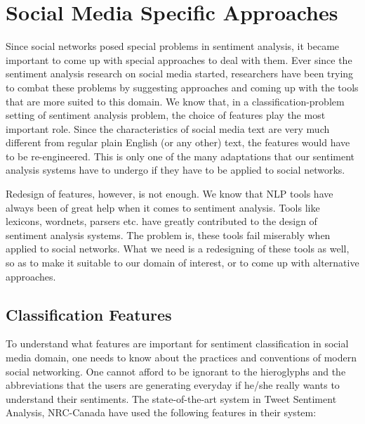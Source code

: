\chapter{Social Media Specific Approaches}\label{ch:saosm}


Since social networks posed special problems in sentiment analysis, it became important to come up with special approaches to deal with them. Ever since the sentiment analysis
research on social media started, researchers have been trying to combat these problems by suggesting approaches and coming up with the tools that are more suited to this domain.
We know that, in a classification-problem setting of sentiment analysis problem, the choice of features play the most important role. Since the characteristics of social media
text are very much different from regular plain English (or any other) text, the features would have to be re-engineered. This is only one of the many adaptations that our
sentiment analysis systems have to undergo if they have to be applied to social networks. 

\vspace{8mm}

Redesign of features, however, is not enough. We know that NLP tools have always been of great help when it comes to sentiment analysis. Tools like lexicons, wordnets, parsers etc. have
greatly contributed to the design of sentiment analysis systems. The problem is, these tools fail miserably when applied to social networks. What we need is a redesigning of these
tools as well, so as to make it suitable to our domain of interest, or to come up with alternative approaches.


\section{Classification Features}

To understand what features are important for sentiment classification in social media domain, one needs to know about the practices and conventions of modern social networking.
One cannot afford to be ignorant to the hieroglyphs and the abbreviations that the users are generating everyday if he/she really wants to understand their sentiments.
The state-of-the-art system in Tweet Sentiment Analysis, NRC-Canada have used the following features in their system: \cite{saif}


